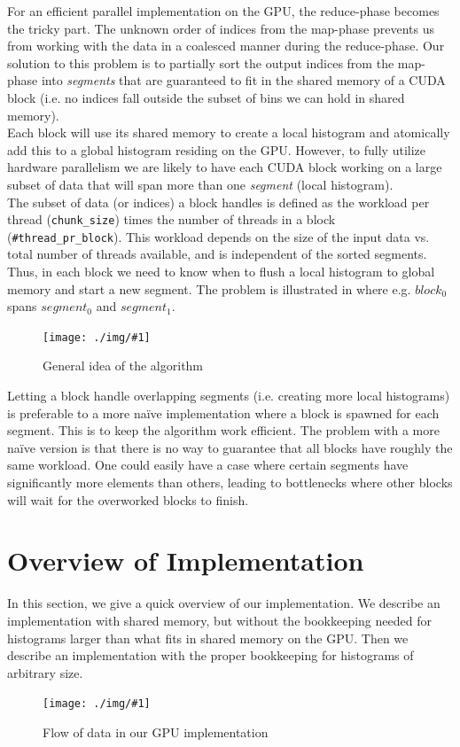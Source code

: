 \documentclass[12pt, a4paper, hidelinks]{article}
\newcommand{\fig}[3]{
\begin{figure}[h]
  \begin{center}
    \texttt{[image: ./img/\#1]}
  \end{center}
  \caption{#3}
  \label{fig:#1}
\end{figure}
}
\renewcommand{\tt}[1]{\texttt{#1}}
\renewcommand{\it}[1]{\textit{#1}}
\begin{document}
For an efficient parallel implementation on the GPU,
the reduce-phase becomes the tricky part.
The unknown order of indices from the map-phase
prevents us from working with the data in a coalesced manner during the reduce-phase.
Our solution to this problem is to partially sort the output indices from
the map-phase into \it{segments} that are guaranteed to fit in the
shared memory of a CUDA block (i.e. no indices fall outside the subset of bins
we can hold in shared memory).\\
Each block will use its shared memory to create a local histogram
and atomically add this to a global histogram residing on the GPU.
However, to fully utilize hardware parallelism we are likely to have
each CUDA block working on a large subset of data that will
span more than one \it{segment} (local histogram).\\
The subset of data (or indices) a block handles is defined as the workload per thread
(\tt{chunk\_size}) times the number of threads in a block (\tt{\#thread\_pr\_block}).
This workload depends on the size of the input data vs.
total number of threads available, and is independent of the sorted segments.
Thus, in each block we need to know when to flush a local histogram to global
memory and start a new segment.
The problem is illustrated in  where e.g.
$block_0$ spans $segment_0$ and $segment_1$.

\fig{overview}{140}{General idea of the algorithm}

Letting a block handle overlapping segments (i.e. creating more local histograms)
is preferable to a more naïve implementation where a block is spawned
for each segment. This is to keep the algorithm work efficient.
The problem with a more naïve version is that there is no way
to guarantee that all blocks have roughly the same workload.
One could easily have a case where certain segments have significantly
more elements than others, leading to bottlenecks where other blocks will
wait for the overworked blocks to finish.

\section{Overview of Implementation}
In this section, we give a quick overview of our implementation. We describe
an implementation with shared memory, but without the bookkeeping needed for
histograms larger than what fits in shared memory on the GPU. Then we describe
an implementation with the proper bookkeeping for histograms of arbitrary size.
\fig{device-dia}{140}{Flow of data in our GPU implementation}
\end{document}
